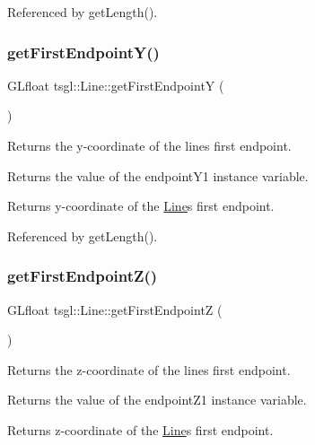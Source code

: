 Referenced by get\+Length().

\mbox{\label{classtsgl_1_1_line_aa5557e97826d20633507afe22413663d}} 
\subsubsection{\texorpdfstring{get\+First\+Endpoint\+Y()}{getFirstEndpointY()}}
{\footnotesize\ttfamily G\+Lfloat tsgl\+::\+Line\+::get\+First\+EndpointY (\begin{DoxyParamCaption}{ }\end{DoxyParamCaption})}



Returns the y-\/coordinate of the line\textquotesingle{}s first endpoint. 

Returns the value of the endpoint\+Y1 instance variable. \begin{DoxyReturn}{Returns}
y-\/coordinate of the \hyperlink{classtsgl_1_1_line}{Line}\textquotesingle{}s first endpoint. 
\end{DoxyReturn}


Referenced by get\+Length().

\mbox{\label{classtsgl_1_1_line_abea9b128dff112bb45f3e9318c160534}} 
\subsubsection{\texorpdfstring{get\+First\+Endpoint\+Z()}{getFirstEndpointZ()}}
{\footnotesize\ttfamily G\+Lfloat tsgl\+::\+Line\+::get\+First\+EndpointZ (\begin{DoxyParamCaption}{ }\end{DoxyParamCaption})}



Returns the z-\/coordinate of the line\textquotesingle{}s first endpoint. 

Returns the value of the endpoint\+Z1 instance variable. \begin{DoxyReturn}{Returns}
z-\/coordinate of the \hyperlink{classtsgl_1_1_line}{Line}\textquotesingle{}s first endpoint. 
\end{DoxyReturn}


